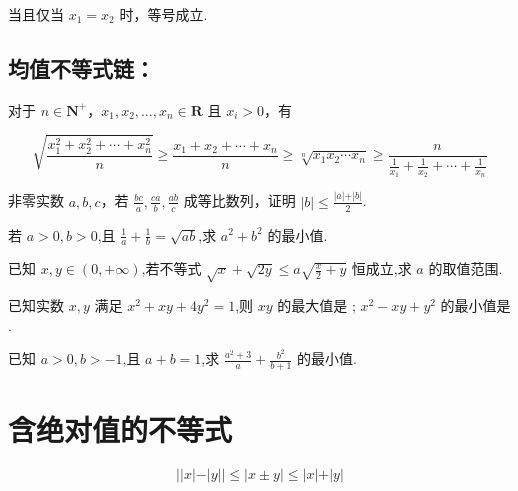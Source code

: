 \documentclass[a4paper , final]{ctexart}
\newenvironment{problem}[1]{%
  \item #1
  \par
  \vspace{8cm}
}{}
\begin{document}
当且仅当 $x_1=x_2$ 时，等号成立.

\subsection*{均值不等式链：}

对于 $n\in\mathbf{N}^+$，$x_1,x_2,\ldots,x_n\in\mathbf{R}$ 且 $x_i>0$，有

$$
\sqrt{\frac{x_1^2+x_2^2+\cdots+x_n^2}{n}} \geq \frac{x_1+x_2+\cdots+x_n}{n} \geq \sqrt[n]{x_1x_2\cdots x_n}\geq \frac{n}{\frac{1}{x_1}+\frac{1}{x_2}+\cdots+\frac{1}{x_n}}
$$

\begin{problems}
  \begin{problem}
    {
      非零实数 $a,b,c$，若 $\frac{bc}{a},\frac{ca}{b},\frac{ab}{c}$ 成等比数列，证明 $\vert b\vert\leq \frac{\vert a \vert +\vert b\vert}{2}$.
    }
  \end{problem}

  \begin{problem}
    {
      若 $a>0,b>0$,且 $\frac{1}{a}+\frac{1}{b} =\sqrt{ab}$,求 $a^2+b^2$ 的最小值.
    }
  \end{problem}

  \begin{problem}
    {
      已知 $x,y\in(0,+\infty)$,若不等式 $\sqrt{x}+\sqrt{2y}\leq a\sqrt{\frac{x}{2}+y}$ 恒成立,求 $a$ 的取值范围.
    }
  \end{problem}

  \begin{problem}
    {
      已知实数 $x,y$ 满足 $x^2+xy+4y^2=1$,则 $xy$ 的最大值是 \underline{\hspace{2cm}}; $x^2-xy+y^2$ 的最小值是 \underline{\hspace{2cm}}.
    }
  \end{problem}

  \begin{problem}
    {
      已知 $a>0,b>-1$,且 $a+b=1$,求 $\frac{a^2+3}{a}+\frac{b^2}{b+1}$ 的最小值.
    }
  \end{problem}
\end{problems}

\newpage
\section*{含绝对值的不等式}

$$
\vert \vert x\vert -\vert y\vert \vert \leq \vert x\pm y \vert \leq\vert x\vert +\vert y\vert
$$
\end{document}
